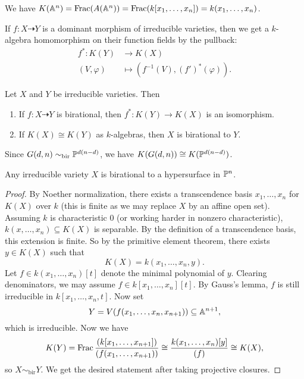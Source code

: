 \begin{example}
  We have
  $K(\mathbb{A}^n) = \operatorname{Frac}(A(\mathbb{A}^n)) = \operatorname{Frac}(k[x_1, \dots, x_n]) = k(x_1, \dots, x_n)$.
\end{example}

\begin{remark}
  If $f : X \dashrightarrow Y$ is a
  dominant morphism of irreducible
  varieties, then we get a $k$-algebra
  homomorphism on their function fields by
  the pullback:
  \begin{align*}
    f^* : K(Y) &\longrightarrow K(X) \\
    (V, \varphi) &\longmapsto
    (f^{-1}(V), (f')^*(\varphi)).
  \end{align*}
\end{remark}

\begin{exercise}
  Let $X$ and $Y$ be irreducible varieties.
  Then
  \begin{enumerate}
    \item If $f : X \dashrightarrow Y$ is
      birational, then $f^* : K(Y) \to K(X)$
      is an isomorphism.
    \item If $K(X) \cong K(Y)$ as
      $k$-algebras, then $X$ is birational
      to $Y$.
  \end{enumerate}
\end{exercise}

\begin{example}
  Since $G(d, n) \sim_{\mathrm{bir}} \mathbb{P}^{d(n - d)}$,
  we have $K(G(d, n)) \cong K(\mathbb{P}^{d(n - d)})$.
\end{example}

\begin{corollary}
  Any irreducible variety $X$ is birational
  to a hypersurface in $\mathbb{P}^n$.
\end{corollary}

\begin{proof}
  By Noether normalization, there exists a
  transcendence basis 
  $x_1, \dots, x_n$ for $K(X)$ over $k$
  (this is finite as we may replace $X$ by
  an affine open set).
  Assuming $k$ is characteristic $0$ (or
  working harder in nonzero characteristic),
  $k(x, \dots, x_n) \subseteq K(X)$
  is separable. By the definition of a
  transcendence basis, this extension is
  finite. So by the primitive element
  theorem, there exists $y \in K(X)$ such
  that
  \[K(X) = k(x_1, \dots, x_n, y).\] Let
  $f \in k(x_1, \dots, x_n)[t]$ denote
  the minimal polynomial of $y$.
  Clearing denominators, we may assume
  $f \in k[x_1, \dots, x_n][t]$.
  By Gauss's lemma, $f$ is still
  irreducible in $k[x_1, \dots, x_n, t]$.
  Now set
  \[
    Y = V(f(x_1, \dots, x_n, x_{n + 1}))
    \subseteq \mathbb{A}^{n + 1},
  \]
  which is irreducible. Now we have
  \[
    K(Y) =
    \operatorname{Frac}
    \frac{(k[x_1, \dots, x_{n + 1}])}
    {(f(x_1, \dots, x_{n + 1}))}
    \cong \frac{k(x_1, \dots, x_n)[y]}{(f)}
    \cong K(X),
  \]
  so $X \sim_{\mathrm{bir}} Y$.
  We get the desired statement after
  taking projective closures.
\end{proof}
